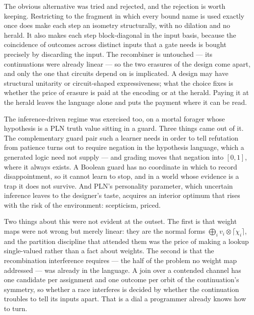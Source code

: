 \documentclass[11pt,a4paper]{article}
\theoremstyle{plain}
\theoremstyle{definition}
\theoremstyle{remark}
\newcommand{\tensorv}{\otimes}
\newcommand{\crisp}[1]{\lceil #1 \rceil}
\begin{document}
The obvious alternative was tried and rejected, and the rejection is worth
keeping. Restricting to the fragment in which every bound name is used exactly
once does make each step an isometry structurally, with no dilation and no
herald. It also makes each step block-diagonal in the input basis, because the
coincidence of outcomes across distinct inputs that a gate needs is bought
precisely by discarding the input. The recombiner is untouched --- its
continuations were already linear --- so the two erasures of the design come
apart, and only the one that circuits depend on is implicated. A design may have
structural unitarity or circuit-shaped expressiveness; what the choice fixes is
whether the price of erasure is paid at the encoding or at the herald. Paying it
at the herald leaves the language alone and puts the payment where it can be
read.

The inference-driven regime was exercised too, on a mortal forager whose
hypothesis is a PLN truth value sitting in a guard. Three things came out of it.
The complementary guard pair such a learner needs in order to tell refutation
from patience turns out to require negation in the hypothesis language, which a
generated logic need not supply --- and grading moves that negation into $[0,1]$,
where it always exists. A Boolean guard has no coordinate in which to record
disappointment, so it cannot learn to stop, and in a world whose evidence is a
trap it does not survive. And PLN's personality parameter, which uncertain
inference leaves to the designer's taste, acquires an interior optimum that rises
with the risk of the environment: scepticism, priced.

Two things about this were not evident at the outset. The first is that weight
maps were not wrong but merely linear: they are the normal forms
$\bigoplus_i v_i \tensorv \crisp{\chi_i}$, and the partition discipline that
attended them was the price of making a lookup single-valued rather than a fact
about weights. The second is that the recombination interference requires ---
the half of the problem no weight map addressed --- was already in the language.
A join over a contended channel has one candidate per assignment and one outcome
per orbit of the continuation's symmetry, so whether a race interferes is decided
by whether the continuation troubles to tell its inputs apart. That is a dial a
programmer already knows how to turn.
\end{document}

